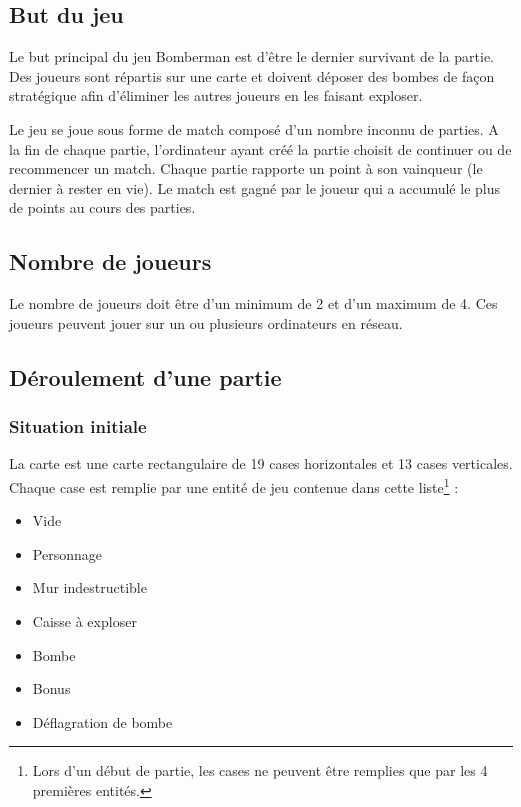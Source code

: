 \subsection{But du jeu}

Le but principal du jeu Bomberman est d'être le dernier survivant de la partie. Des joueurs sont répartis sur une carte et doivent déposer des bombes de façon stratégique afin d'éliminer les autres joueurs en les faisant exploser.

Le jeu se joue sous forme de match composé d'un nombre inconnu de parties. A la fin de chaque partie, l'ordinateur ayant créé la partie choisit de continuer ou de recommencer un match. Chaque partie rapporte un point à son vainqueur (le dernier à rester en vie). Le match est gagné par le joueur qui a accumulé le plus de points au cours des parties.

\subsection{Nombre de joueurs}

Le nombre de joueurs doit être d'un minimum de 2 et d'un maximum de 4. Ces joueurs peuvent jouer sur un ou plusieurs ordinateurs en réseau.

\subsection{Déroulement d'une partie}

\subsubsection{Situation initiale}

La carte est une carte rectangulaire de 19 cases horizontales et 13 cases verticales. Chaque case est remplie par une entité de jeu contenue dans cette liste\footnote{Lors d'un début de partie, les cases ne peuvent être remplies que par les 4 premières entités.} :

\begin{itemize}
    \item Vide
    \item Personnage
    \item Mur indestructible
    \item Caisse à exploser
    \item Bombe
    \item Bonus
    \item Déflagration de bombe
\end{itemize}

